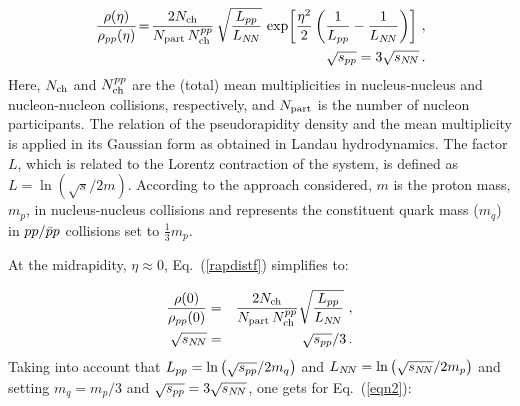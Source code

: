 \documentclass[twocolumn,showpacs,preprintnumbers,prd,superscriptaddress,nofootinbib]{revtex4}
\begin{document}
 \begin{eqnarray}
 &\!\!\!\!\! &    
 \nonumber
\frac{\rho(\eta)}{\rho_{pp}(\eta)}\!=\!
\frac{2N_{\rm{ch}}}{N_{\rm{part}}\, N_{\rm{ch}}^{pp}}
\, \sqrt{\frac{L_{pp}}{L_{N\!N}}} \,
 \exp\! \left[ \frac{\eta^2}{2} \left(
 \frac{1}{L_{pp}}
 - 
 \frac{1}{L_{N\!N}} 
 \right) \right] \, , \\
 &\!\!\!\!\! &    
 \spp=3\sNN\, .
 \label{rapdistf}
 \end{eqnarray}
 Here, 
 $N_{\rm{ch}}$ and 
 $N_{\rm{ch}}^{pp}$ are the (total) mean multiplicities in nucleus-nucleus 
and nucleon-nucleon collisions, respectively, and $N_{\rm {part}}$ is the 
number of nucleon 
participants. The relation of the pseudorapidity density 
and the 
mean multiplicity is applied in its Gaussian form as obtained in Landau 
hydrodynamics. The factor $L$, which is related to the Lorentz contraction of the system,
 is defined as $L = {\ln}({\sqrt{s}}/{2m})$. 
According to the approach considered, $m$ is the proton mass, $m_{p}$, in 
nucleus-nucleus collisions and
 represents the constituent quark mass ($m_{q}$) in $pp/{\bar p}p$ collisions 
 set
 to  $\frac{1}{3}m_{{p}}$.


 At the midrapidity, $\eta\! \approx\! 0$,  Eq.~(\ref{rapdistf}) 
simplifies  to: 

\begin{eqnarray}
\nonumber
\frac{\rho(0)}{\rho_{pp}(0)}&=&
\frac{2N_{\rm{ch}}}{N_{\rm{part}}\, N_{\rm{ch}}^{pp}} 
\sqrt{\frac{L_{pp}}{L_{N\!N}}} \ , \\
\sqrt{s_{N\!N}}&=&\sqrt{s_{pp}}/3 \, .
 \label{eqn2}
\end{eqnarray}
Taking into account that $L_{pp} = \ln \left( \sqrt{s_{pp}}/2m_q \right)$ 
 and  $L_{N\!N} = \ln \left( \sqrt{s_{N\!N}}/2m_p \right)$ and setting
  $m_q=m_p/3$ 
 and  $\sqrt{s_{pp}}=3\sqrt{s_{N\!N}}$, one gets for Eq.~(\ref{eqn2}):
\end{document}
